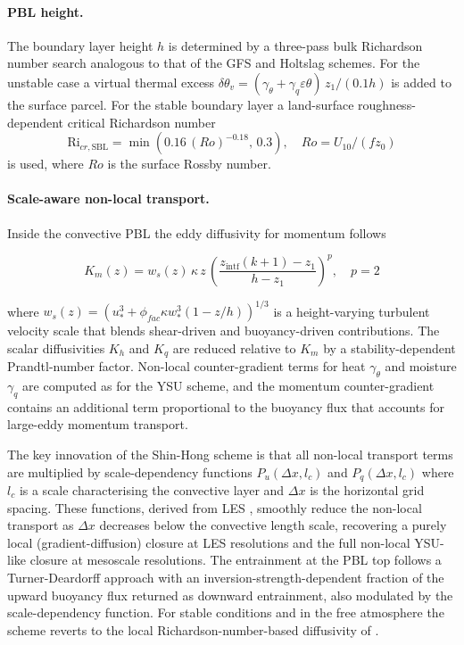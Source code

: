 \paragraph{PBL height.}
The boundary layer height $h$ is determined by a three-pass bulk Richardson
number search analogous to that of the GFS and Holtslag schemes.  For the
unstable case a virtual thermal excess
$\delta\theta_v = (\gamma_\theta + \gamma_q \varepsilon\theta)\,z_1/(0.1h)$
is added to the surface parcel.  For the stable boundary layer a land-surface
roughness-dependent critical Richardson number \citep{Vickers_04}
\begin{equation}
  \mathrm{Ri}_{cr,\mathrm{SBL}} = \min\!\left(0.16\,(Ro)^{-0.18},\,0.3\right),
  \quad Ro = U_{10}/(f z_0)
\end{equation}
is used, where $Ro$ is the surface Rossby number.

\paragraph{Scale-aware non-local transport.}
Inside the convective PBL the eddy diffusivity for momentum follows

\begin{equation}
  K_m(z) = w_s(z)\,\kappa\,z\,\left(\frac{z_\mathrm{intf}(k+1)-z_1}{h-z_1}\right)^p,
  \quad p = 2
\end{equation}

where $w_s(z) = (u_*^3 + \phi_{fac}\kappa w_*^3(1-z/h))^{1/3}$ is a
height-varying turbulent velocity scale that blends shear-driven and
buoyancy-driven contributions.  The scalar diffusivities $K_h$ and $K_q$ are
reduced relative to $K_m$ by a stability-dependent Prandtl-number factor.
Non-local counter-gradient terms for heat $\gamma_\theta$ and moisture
$\gamma_q$ are computed as for the YSU scheme, and the
momentum counter-gradient contains an additional term proportional to
the buoyancy flux that accounts for large-eddy momentum transport.

The key innovation of the Shin-Hong scheme is that all non-local transport terms
are multiplied by scale-dependency functions $P_u(\Delta x,l_c)$ and
$P_q(\Delta x,l_c)$ where $l_c$ is a scale characterising the convective layer
and $\Delta x$ is the horizontal grid spacing.  These functions, derived from
LES \citep{Shin_13}, smoothly reduce the non-local transport as $\Delta x$
decreases below the convective length scale, recovering a purely local
(gradient-diffusion) closure at LES resolutions and the full non-local
YSU-like closure at mesoscale resolutions.  The entrainment at the PBL top
follows a Turner-Deardorff approach with an inversion-strength-dependent
fraction of the upward buoyancy flux returned as downward entrainment, also
modulated by the scale-dependency function.  For stable conditions and in the
free atmosphere the scheme reverts to the local Richardson-number-based
diffusivity of \cite{Hong_10}.

